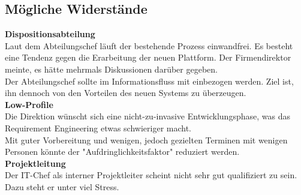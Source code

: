 \subsection{Mögliche Widerstände}
  \textbf{Dispositionsabteilung}\\
  Laut dem Abteilungschef läuft der bestehende Prozess einwandfrei. Es besteht eine Tendenz gegen die Erarbeitung der neuen Plattform.
  Der Firmendirektor meinte, es hätte mehrmals Diskussionen darüber gegeben.\\
  Der Abteilungschef sollte im Informationsfluss mit einbezogen werden. Ziel ist, ihn dennoch von den Vorteilen des neuen Systems zu überzeugen.\\[2ex]
  \textbf{Low-Profile}\\
  Die Direktion wünscht sich eine nicht-zu-invasive Entwicklungsphase, was das Requirement Engineering etwas schwieriger macht.\\
  Mit guter Vorbereitung und wenigen, jedoch gezielten Terminen mit wenigen Personen könnte der "Aufdringlichkeitsfaktor" reduziert werden. \\[2ex]
  \textbf{Projektleitung}\\
  Der IT-Chef als interner Projektleiter scheint nicht sehr gut qualifiziert zu sein. Dazu steht er unter viel Stress.